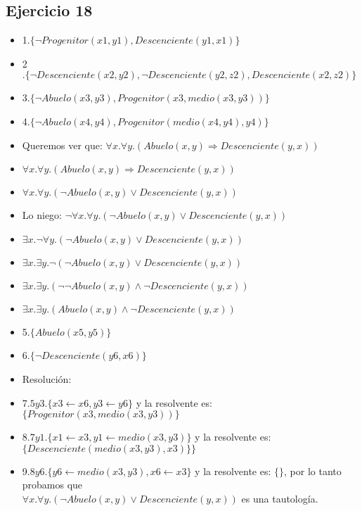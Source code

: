 \documentclass[10pt,a4paper]{article}
\begin{document}
\subsection{Ejercicio 18}
    \begin{itemize}
        \item 1$.\{ \lnot Progenitor(x1,y1),Descenciente(y1,x1)\}$ 
        \item 2$.\{ \lnot Descenciente(x2,y2), \lnot Descenciente(y2,z2), Descenciente(x2,z2)\}$ 
        \item 3$.\{ \lnot Abuelo(x3,y3), Progenitor(x3, medio(x3,y3))\}$ 
        \item 4$.\{ \lnot Abuelo(x4,y4), Progenitor(medio(x4,y4),y4)\}$ 
        \item Queremos ver que: $\forall x. \forall y. (Abuelo(x,y) \Rightarrow Descenciente(y,x))$ 
        \item $\forall x. \forall y. (Abuelo(x,y) \Rightarrow Descenciente(y,x))$ 
        \item $\forall x. \forall y. (\lnot Abuelo(x,y) \lor Descenciente(y,x))$ 
        \item Lo niego: $\lnot \forall x. \forall y. (\lnot Abuelo(x,y) \lor Descenciente(y,x))$ 
        \item $\exists x. \lnot \forall y. (\lnot Abuelo(x,y) \lor Descenciente(y,x))$ 
        \item $\exists x. \exists y. \lnot (\lnot Abuelo(x,y) \lor Descenciente(y,x))$ 
        \item $\exists x. \exists y. (\lnot \lnot Abuelo(x,y) \land \lnot Descenciente(y,x))$ 
        \item $\exists x. \exists y. (Abuelo(x,y) \land \lnot Descenciente(y,x))$ 
        \item 5$.\{Abuelo(x5,y5)\} $  
        \item 6$.\{ \lnot Descenciente(y6,x6)\} $ \\
        \item Resolución: 
        \item 7$. 5y3. \{x3 \leftarrow x6, y3 \leftarrow y6\}$ y la resolvente es: $\{Progenitor(x3, medio(x3,y3))\}$ 
        \item 8$. 7y1. \{x1 \leftarrow x3, y1 \leftarrow medio(x3,y3)\}$ y la resolvente es: $\{Descenciente( medio(x3,y3),x3)\}\}$ 
        \item 9.$ 8y6. \{y6 \leftarrow medio(x3,y3), x6 \leftarrow x3\}$ y la resolvente es: $\{\}$, por lo tanto probamos que \\ $\forall x. \forall y. (\lnot Abuelo(x,y) \lor Descenciente(y,x))$ es una tautología.
    \end{itemize}
\end{document}

